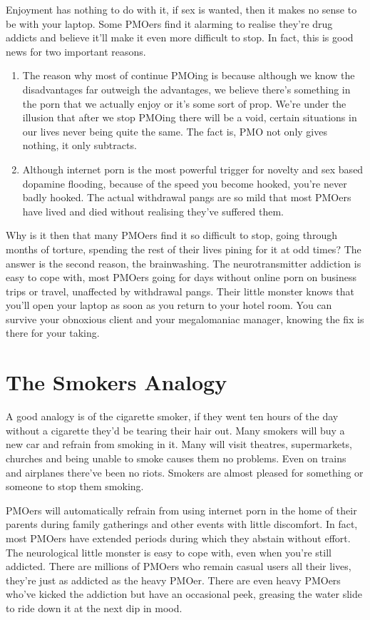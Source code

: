 \documentclass[easypeasy.tex]{subfiles}
\begin{document}
Enjoyment has nothing to do with it, if sex is wanted, then it makes no sense to be with your laptop. Some PMOers find it alarming to realise they're drug addicts and believe it'll make it even more difficult to stop. In fact, this is good news for two important reasons.
    \begin{enumerate}
      \item The reason why most of continue PMOing is because although we know the disadvantages far outweigh the advantages, we believe there's something in the porn that we actually enjoy or it's some sort of prop. We're under the illusion that after we stop PMOing there will be a void, certain situations in our lives never being quite the same. The fact is, PMO not only gives nothing, it only subtracts.

      \item Although internet porn is the most powerful trigger for novelty and sex based dopamine flooding, because of the speed you become hooked, you're never badly hooked. The actual withdrawal pangs are so mild that most PMOers have lived and died without realising they've suffered them.
    \end{enumerate}

Why is it then that many PMOers find it so difficult to stop, going through months of torture, spending the rest of their lives pining for it at odd times? The answer is the second reason, the brainwashing. The neurotransmitter addiction is easy to cope with, most PMOers going for days without online porn on business trips or travel, unaffected by withdrawal pangs. Their little monster knows that you'll open your laptop as soon as you return to your hotel room. You can survive your obnoxious client and your megalomaniac manager, knowing the fix is there for your taking.

\section{The Smokers Analogy}
A good analogy is of the cigarette smoker, if they went ten hours of the day without a cigarette they'd be tearing their hair out. Many smokers will buy a new car and refrain from smoking in it. Many will visit theatres, supermarkets, churches and being unable to smoke causes them no problems. Even on trains and airplanes there've been no riots. Smokers are almost pleased for something or someone to stop them smoking.

PMOers will automatically refrain from using internet porn in the home of their parents during family gatherings and other events with little discomfort. In fact, most PMOers have extended periods during which they abstain without effort. The neurological little monster is easy to cope with, even when you're still addicted. There are millions of PMOers who remain casual users all their lives, they're just as addicted as the heavy PMOer. There are even heavy PMOers who've kicked the addiction but have an occasional peek, greasing the water slide to ride down it at the next dip in mood.
\end{document}
